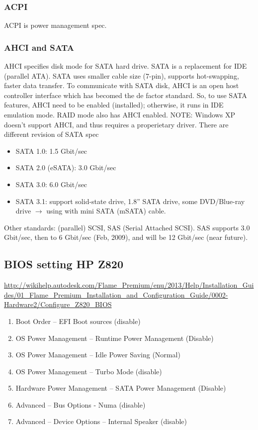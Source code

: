 \subsubsection{ACPI}

ACPI is power management spec.

\subsubsection{AHCI and SATA}

AHCI specifies disk mode for SATA hard drive. SATA is a replacement for IDE
(parallel ATA). SATA uses smaller cable size (7-pin), supports hot-swapping,
faster data transfer. To communicate with SATA disk, AHCI is an open host controller
interface which has becomed the de factor standard. So, to use SATA features,
AHCI need to be enabled (installed); otherwise, it runs in IDE emulation mode.
RAID mode also has AHCI enabled. NOTE: Windows XP doesn't support AHCI, and thus
requires a properietary driver. There are different revision of SATA spec
\begin{itemize}
  \item SATA 1.0: 1.5 Gbit/sec
  \item SATA 2.0 (eSATA): 3.0 Gbit/sec
  \item SATA 3.0: 6.0 Gbit/sec	
  \item SATA 3.1: support solid-state drive, 1.8'' SATA drive, some DVD/Blue-ray
  drive $\rightarrow$ using with mini SATA (mSATA) cable.
\end{itemize}
 
Other standards: (parallel) SCSI, SAS (Serial Attached SCSI). SAS supports 3.0
Gbit/sec, then to 6 Gbit/sec (Feb, 2009), and will be 12 Gbit/sec (near
future).

\subsection{BIOS setting HP Z820}
\label{sec:BIOS_Z820}

\url{http://wikihelp.autodesk.com/Flame_Premium/enu/2013/Help/Installation_Guides/01_Flame_Premium_Installation_and_Configuration_Guide/0002-Hardware2/Configure_Z820_BIOS}

\begin{enumerate}
  \item Boot Order -- EFI Boot sources (disable)
  \item OS Power Management -- Runtime Power Management (Disable)
  \item OS Power Management -- Idle Power Saving (Normal)
  \item OS Power Management -- Turbo Mode (disable)
  \item Hardware Power Management -- SATA Power Management (Disable)
  \item Advanced -- Bus Options - Numa (disable)
  \item Advanced -- Device Options -- Internal Speaker (disable)
    
\end{enumerate}

